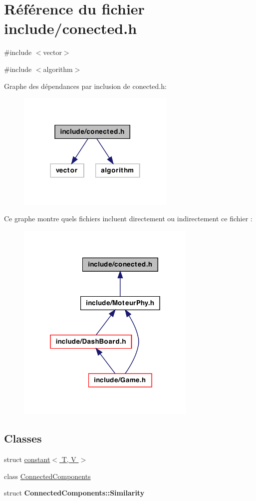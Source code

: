 \hypertarget{a00020}{
\section{Référence du fichier include/conected.h}
\label{a00020}
}
{\ttfamily \#include $<$vector$>$}\par
{\ttfamily \#include $<$algorithm$>$}\par
Graphe des dépendances par inclusion de conected.h:
\nopagebreak
\begin{figure}[H]
\begin{center}
\leavevmode
\includegraphics[width=214pt]{a00045}
\end{center}
\end{figure}
Ce graphe montre quels fichiers incluent directement ou indirectement ce fichier :
\nopagebreak
\begin{figure}[H]
\begin{center}
\leavevmode
\includegraphics[width=244pt]{a00046}
\end{center}
\end{figure}
\subsection*{Classes}
\begin{DoxyCompactItemize}
\item 
struct \hyperlink{a00005}{constant$<$ T, V $>$}
\item 
class \hyperlink{a00004}{ConnectedComponents}
\item 
struct {\bfseries ConnectedComponents::Similarity}
\end{DoxyCompactItemize}
